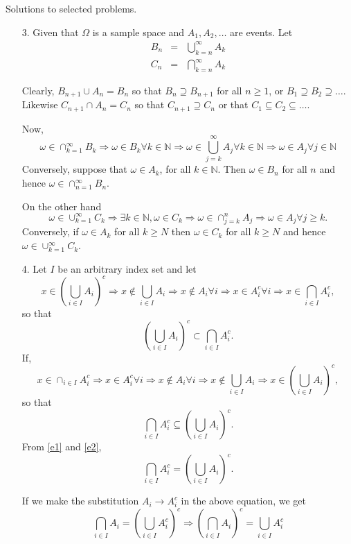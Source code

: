 \documentclass{article}
\newcommand{\son}{\mathbb{N}}
\begin{document}
Solutions to selected problems.
\begin{enumerate}
\item[3.] Given that $\Omega$ is a sample space and $A_1, A_2, \ldots$ are
events. Let
\begin{eqnarray*}
B_n &=& \bigcup_{k=n}^\infty A_k \\
C_n &=& \bigcap_{k=n}^\infty A_k
\end{eqnarray*}

Clearly, $B_{n+1} \cup A_{n} = B_{n}$ so that $B_n \supseteq B_{n+1}$ for all $n
\ge 1$, or $B_1 \supseteq B_2 \supseteq \ldots$. Likewise $C_{n+1} \cap A_{n} = 
C_n$ so that $C_{n+1} \supseteq C_n$ or that $C_1 \subseteq C_2 \subseteq \ldots$.

Now,
\[
\omega \in \cap_{k=1}^\infty B_k \Rightarrow \omega \in B_k \forall k \in \son
\Rightarrow \omega \in \bigcup_{j=k}^\infty A_j \forall k \in \son \Rightarrow
\omega \in A_j \forall j \in \son
\]
Conversely, suppose that $\omega \in A_k$, for all $k \in \son$. Then $\omega \in
B_n$ for all $n$ and hence $\omega \in \cap_{n=1}^\infty B_n$.

On the other hand
\[
\omega \in \cup_{k=1}^\infty C_k \Rightarrow \exists k \in \son, \omega \in C_k
\Rightarrow \omega \in \cap_{j=k}^n A_j \Rightarrow \omega \in A_j \forall j
\ge k.
\]
Conversely, if $\omega \in A_k$ for all $k \ge N$ then $\omega \in C_k$ for all
$k \ge N$ and hence $\omega \in \cup_{k=1}^\infty C_k$.

\item[4.] Let $I$ be an arbitrary index set and let
\[
x \in \left(\bigcup_{i \in I}A_i\right)^c \Rightarrow x \notin \bigcup_{i \in I}A_i
\Rightarrow x \notin A_i \forall i \Rightarrow x \in A_i^c \forall i \Rightarrow 
x \in \bigcap_{i\in I}A_i^c,
\]
so that
\begin{equation}\label{e1}
\left(\bigcup_{i \in I}A_i\right)^c \subset \bigcap_{i\in I}A_i^c.
\end{equation}
If,
\[
x \in \cap_{i\in I}A_i^c \Rightarrow x \in A_i^c \forall i \Rightarrow
x \notin A_i \forall i \Rightarrow x \notin \bigcup_{i \in I}A_i
\Rightarrow x \in \left(\bigcup_{i \in I}A_i\right)^c,
\]
so that
\begin{equation}\label{e2}
\bigcap_{i\in I}A_i^c \subseteq \left(\bigcup_{i \in I}A_i\right)^c.
\end{equation}
From \eqref{e1} and \eqref{e2},
\[
\bigcap_{i\in I}A_i^c = \left(\bigcup_{i \in I}A_i\right)^c.
\]

If we make the substitution $A_i \rightarrow A_i^c$ in the above equation, we 
get
\[
\bigcap_{i\in I}A_i = \left(\bigcup_{i \in I}A_i^c\right)^c \Rightarrow
\left(\bigcap_{i \in I}A_i\right)^c = \bigcup_{i \in I}A_i^c
\]


\end{enumerate}
\end{document}
